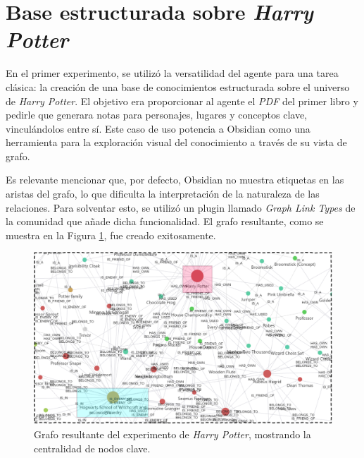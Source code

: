 \section{Base estructurada sobre \textit{Harry Potter}}
En el primer experimento, se utilizó la versatilidad del agente para una tarea clásica: la creación de una base de conocimientos estructurada sobre el universo de \textit{Harry Potter}. El objetivo era proporcionar al agente el \textit{PDF} del primer libro y pedirle que generara notas para personajes, lugares y conceptos clave, vinculándolos entre sí. Este caso de uso potencia a Obsidian como una herramienta para la exploración visual del conocimiento a través de su vista de grafo.

Es relevante mencionar que, por defecto, Obsidian no muestra etiquetas en las aristas del grafo, lo que dificulta la interpretación de la naturaleza de las relaciones. Para solventar esto, se utilizó un plugin llamado \textit{Graph Link Types} de la comunidad que añade dicha funcionalidad. El grafo resultante, como se muestra en la Figura \ref{fig:hp_graph}, fue creado exitosamente. 

\begin{figure}[h]
    \centering
    \includegraphics[width=1.0\textwidth]{figures/HPKG.pdf}
    \caption{Grafo resultante del experimento de \textit{Harry Potter}, mostrando la centralidad de nodos clave.}
    \label{fig:hp_graph}
\end{figure}

